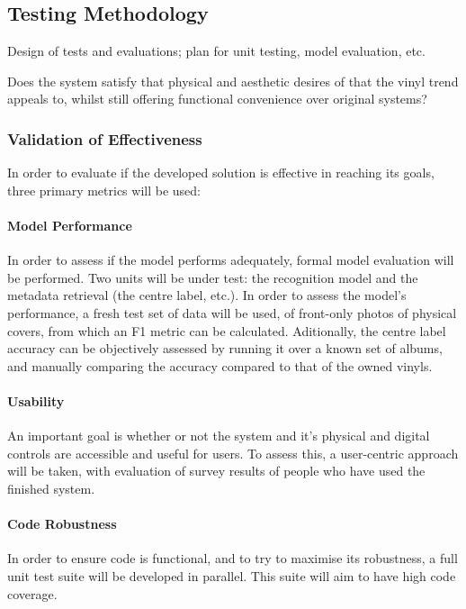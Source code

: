         \subsection{Testing Methodology}
    
            \begin{temp}
                Design of tests and evaluations; plan for unit testing, model evaluation, etc.
                
                Does the system satisfy that physical and aesthetic desires of that the vinyl trend appeals to, whilst still offering functional convenience over original systems?
            \end{temp}
            
            \subsubsection{Validation of Effectiveness}
    
                In order to evaluate if the developed solution is effective in reaching its goals, three primary metrics will be used:
    
                \paragraph{Model Performance} In order to assess if the model performs adequately, formal model evaluation will be performed. Two units will be under test: the recognition model and the metadata retrieval (the centre label, etc.). In order to assess the model's performance, a fresh test set of data will be used, of front-only photos of physical covers, from which an F1 metric can be calculated. Aditionally, the centre label accuracy can be objectively assessed by running it over a known set of albums, and manually comparing the accuracy compared to that of the owned vinyls.
    
                \paragraph{Usability} An important goal is whether or not the system and it's physical and digital controls are accessible and useful for users. To assess this, a user-centric approach will be taken, with evaluation of survey results of people who have used the finished system.
    
                \paragraph{Code Robustness} In order to ensure code is functional, and to try to maximise its robustness, a full unit test suite will be developed in parallel. This suite will aim to have high code coverage.
        
